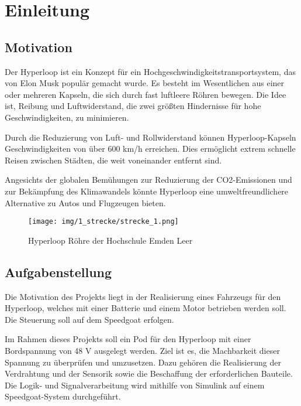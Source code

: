 \chapter{Einleitung}

\section{Motivation}
Der Hyperloop ist ein Konzept für ein Hochgeschwindigkeitstransportsystem, das von Elon Musk \cite{tesla:Hyperloop_impact} populär gemacht wurde. Es besteht im Wesentlichen aus einer oder mehreren Kapseln, die sich durch fast luftleere Röhren bewegen. Die Idee ist, Reibung und Luftwiderstand, die zwei größten Hindernisse für hohe Geschwindigkeiten, zu minimieren.

Durch die Reduzierung von Luft- und Rollwiderstand können Hyperloop-Kapseln Geschwindigkeiten von über 600 km/h erreichen. Dies ermöglicht extrem schnelle Reisen zwischen Städten, die weit voneinander entfernt sind.

Angesichts der globalen Bemühungen zur Reduzierung der CO2-Emissionen und zur Bekämpfung des Klimawandels könnte Hyperloop eine umweltfreundlichere Alternative zu Autos und Flugzeugen bieten.

\begin{figure}[ht]
	\begin{center}
		\texttt{[image: img/1\_strecke/strecke\_1.png]}
		\caption{Hyperloop Röhre der Hochschule Emden Leer}
		\label{img_1_1:circ_bldc:1}
	\end{center}
\end{figure}
\newpage



\section{Aufgabenstellung}
Die Motivation des Projekts liegt in der Realisierung eines Fahrzeugs für den Hyperloop, welches mit einer Batterie und einem Motor betrieben werden soll. Die Steuerung soll auf dem Speedgoat erfolgen.
\newline

Im Rahmen dieses Projekts soll ein Pod für den Hyperloop mit einer Bordspannung von 48 V ausgelegt werden. Ziel ist es, die Machbarkeit dieser Spannung zu überprüfen und umzusetzen. Dazu gehören die Realisierung der Verdrahtung und der Sensorik sowie die Beschaffung der erforderlichen Bauteile. Die Logik- und Signalverarbeitung wird mithilfe von Simulink auf einem Speedgoat-System durchgeführt.


